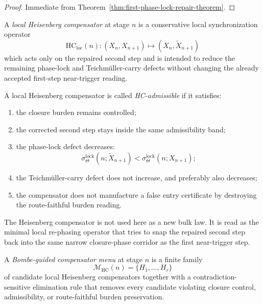 \begin{proof}
Immediate from Theorem~\ref{thm:first-phase-lock-repair-theorem}.
\end{proof}



\begin{definition}
\label{def:local-heisenberg-compensator}
A \emph{local Heisenberg compensator} at stage $n$ is a conservative local synchronization operator
\[
  \mathrm{HC}_{\mathrm{loc}}(n):(X_n,X_{n+1})\longmapsto (X_n,\widetilde X_{n+1})
\]
which acts only on the repaired second step and is intended to reduce the remaining phase-lock and Teichm\"uller-carry defects without changing the already accepted first-step near-trigger reading.
\end{definition}

\begin{definition}
\label{def:hc-admissible-local-compensation}
A local Heisenberg compensator is called \emph{HC-admissible} if it satisfies:
\begin{enumerate}[leftmargin=2em,label=(\alph*)]
  \item the closure burden remains controlled;
  \item the corrected second step stays inside the same admissibility band;
  \item the phase-lock defect decreases:
  \[
    \sigma_{\Theta}^{\mathrm{lock}}(n;\widetilde X_{n+1})
    <
    \sigma_{\Theta}^{\mathrm{lock}}(n;X_{n+1});
  \]
  \item the Teichm\"uller-carry defect does not increase, and preferably also decreases;
  \item the compensator does not manufacture a false entry certificate by destroying the route-faithful burden reading.
\end{enumerate}
\end{definition}

\begin{remark}
\label{rem:how-the-hc-is-read-here}
The Heisenberg compensator is not used here as a new bulk law. It is read as the minimal local re-phasing operator that tries to snap the repaired second step back into the same narrow closure-phase corridor as the first near-trigger step.
\end{remark}

\begin{definition}
\label{def:bombe-guided-compensator-menu}
A \emph{Bombe-guided compensator menu} at stage $n$ is a finite family
\[
  \mathcal M_{\mathrm{HC}}(n)=\{H_1,\dots,H_r\}
\]
of candidate local Heisenberg compensators together with a contradiction-sensitive elimination rule that removes every candidate violating closure control, admissibility, or route-faithful burden preservation.
\end{definition}

